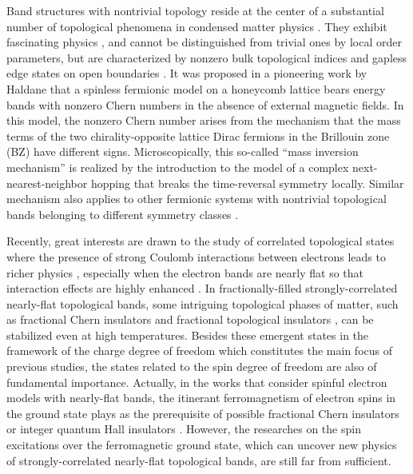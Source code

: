 \documentclass[amsmath,superscriptaddress,showpacs,aps,prl,twocolumn]{revtex4-1}
\begin{document}
\par Band structures with nontrivial topology reside at the center of a substantial number of topological phenomena in condensed matter physics \cite{Hasan_RMP2010,Qi_RMP2011,Bansil_RMP2016}. They exhibit fascinating physics \cite{Chiu_RMP2016,Zeng_B2019}, and cannot be distinguished from trivial ones by local order parameters, but are characterized by nonzero bulk topological indices and gapless edge states on open boundaries \cite{Laughlin_PRB1981,Halperin_PRB1982,Kane_PRL2005a,Bernevig_S2006,Yu_PRL2011}. It was proposed in a pioneering work by Haldane \cite{Haldane_PRL1988} that a spinless fermionic model on a honeycomb lattice bears energy bands with nonzero Chern numbers \cite{Thouless_PRL1982,Simon_PRL1983} in the absence of external magnetic fields. In this model, the nonzero Chern number arises from the mechanism that the mass terms of the two chirality-opposite lattice Dirac fermions in the Brillouin zone (BZ) have different signs. Microscopically, this so-called ``mass inversion mechanism'' is realized by the introduction to the model of a complex next-nearest-neighbor hopping that breaks the time-reversal symmetry locally. Similar mechanism also applies to other fermionic systems with nontrivial topological bands belonging to different symmetry classes \cite{Kane_PRL2005}.

\par Recently, great interests are drawn to the study of correlated topological states where the presence of strong Coulomb interactions between electrons leads to richer physics \cite{Hohenadler_JPCM2013,Wen_RMP2017,Rachel_RPP2018}, especially when the electron bands are nearly flat so that interaction effects are highly enhanced \cite{Neupert_PS2015}. In fractionally-filled strongly-correlated nearly-flat topological bands, some intriguing topological phases of matter, such as fractional Chern insulators \cite{Tang_PRL2011,Wang_PRB2011,Sun_PRL2011,Wang_PRL2011,Neupert_PRL2011,Sheng_NC2011,Regnault_PRX2011} and fractional topological insulators \cite{Neupert_PRB2011}, can be stabilized even at high temperatures. Besides these emergent states in the framework of the charge degree of freedom which constitutes the main focus of previous studies, the states related to the spin degree of freedom are also of fundamental importance. Actually, in the works that consider spinful electron models with nearly-flat bands, the itinerant ferromagnetism \cite{Tasaki_PRL1992,Mielke_PLA1993,Mielke_CMP1993} of electron spins in the ground state plays as the prerequisite of possible fractional Chern insulators \cite{Tang_PRL2011,Wang_PRB2011,Sun_PRL2011} or integer quantum Hall insulators \cite{Neupert_PRL2012}. However, the researches \cite{Doretto_PRB2015,Su_PRB2019} on the spin excitations over the ferromagnetic ground state, which can uncover new physics of strongly-correlated nearly-flat topological bands, are still far from sufficient.
\end{document}
